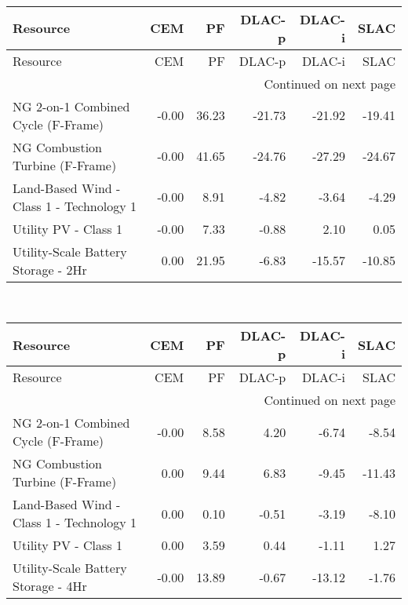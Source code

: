 \documentclass{article}
\begin{document}
\hline
{} \\
\hline
\begin{longtable}{lrrrrr}
\toprule
Resource & CEM & PF & DLAC-p & DLAC-i & SLAC \\
\midrule
\endfirsthead
\toprule
Resource & CEM & PF & DLAC-p & DLAC-i & SLAC \\
\midrule
\endhead
\midrule
\multicolumn{6}{r}{Continued on next page} \\
\midrule
\endfoot
\bottomrule
\endlastfoot
NG 2-on-1 Combined Cycle (F-Frame) & -0.00 & 36.23 & -21.73 & -21.92 & -19.41 \\
NG Combustion Turbine (F-Frame) & -0.00 & 41.65 & -24.76 & -27.29 & -24.67 \\
Land-Based Wind - Class 1 - Technology 1 & -0.00 & 8.91 & -4.82 & -3.64 & -4.29 \\
Utility PV - Class 1 & -0.00 & 7.33 & -0.88 & 2.10 & 0.05 \\
Utility-Scale Battery Storage - 2Hr & 0.00 & 21.95 & -6.83 & -15.57 & -10.85 \\
\end{longtable}


\hline
{} \\
\hline
\begin{longtable}{lrrrrr}
\toprule
Resource & CEM & PF & DLAC-p & DLAC-i & SLAC \\
\midrule
\endfirsthead
\toprule
Resource & CEM & PF & DLAC-p & DLAC-i & SLAC \\
\midrule
\endhead
\midrule
\multicolumn{6}{r}{Continued on next page} \\
\midrule
\endfoot
\bottomrule
\endlastfoot
NG 2-on-1 Combined Cycle (F-Frame) & -0.00 & 8.58 & 4.20 & -6.74 & -8.54 \\
NG Combustion Turbine (F-Frame) & 0.00 & 9.44 & 6.83 & -9.45 & -11.43 \\
Land-Based Wind - Class 1 - Technology 1 & 0.00 & 0.10 & -0.51 & -3.19 & -8.10 \\
Utility PV - Class 1 & 0.00 & 3.59 & 0.44 & -1.11 & 1.27 \\
Utility-Scale Battery Storage - 4Hr & -0.00 & 13.89 & -0.67 & -13.12 & -1.76 \\
\end{longtable}
\end{document}
